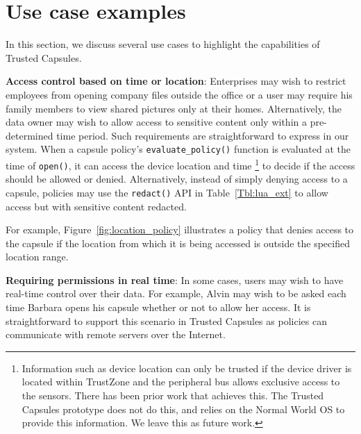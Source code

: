 \chapter{Use case examples}
\label{sec:new-policies}

In this section, we discuss several use cases to highlight the capabilities of
Trusted Capsules. 



\textbf{Access control based on time or location}: Enterprises may wish to
restrict employees from opening company files outside the office or a user may
require his family members to view shared pictures only at their
homes. Alternatively, the data owner may wish to allow access to sensitive
content only within a pre-determined time period. Such requirements are
straightforward to express in our system. When a capsule policy's
\texttt{evaluate\_policy()} function is evaluated at the time of
\texttt{open()}, it can access the device location and time \footnote{Information such as device location can only be trusted if the device driver is located within TrustZone and the peripheral bus allows exclusive access to the sensors. There has been prior work that achieves this. The Trusted Capsules prototype does not do this, and relies on the Normal World OS to provide this information. We leave this as future work.} to decide if the
access should be allowed or denied. Alternatively, instead of simply denying access
to a capsule, policies may use the \texttt{redact()} API in
Table~\ref{Tbl:lua_ext} to allow access but with sensitive content
redacted.

For example, Figure~\ref{fig:location_policy} illustrates a policy
that denies access to the capsule if the location from which it is
being accessed is outside the specified location range. 

\textbf{Requiring permissions in real time}: In some cases, users may wish to
have real-time control over their data. For example, Alvin may wish to be asked
each time Barbara opens his capsule whether or not to allow her access. It is
straightforward to support this scenario in Trusted Capsules as policies can
communicate with remote servers over the Internet.


